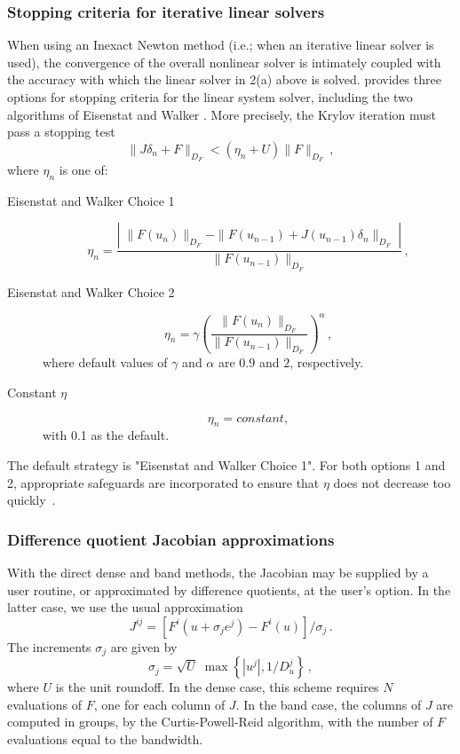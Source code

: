 \subsubsection*{Stopping criteria for iterative linear solvers}
When using an Inexact Newton method (i.e.; when an iterative linear solver is 
used), the convergence of the overall nonlinear solver is intimately coupled
with the accuracy with which the linear solver in 2(a) above is solved.
{\kinsol} provides three options for stopping criteria for the linear system 
solver, including the two algorithms of Eisenstat and Walker \cite{EiWa:96}. 
More precisely, the Krylov iteration must pass a stopping test
\[ \|J \delta_n + F\|_{D_F} < (\eta_n + U) \|F\|_{D_F} \, , \]
where $\eta_n$ is one of:
\begin{description}
\item[Eisenstat and Walker Choice 1]
  \[
  \eta_n = \frac{\left|\; \|F(u_n)\|_{D_F}
      - \|F(u_{n-1}) + J(u_{n-1}) \delta_n \|_{D_F}
      \; \right|}
  {\|F(u_{n-1})\|_{D_F}} \, ,
  \]
\item[Eisenstat and Walker Choice 2]
  \[
  \eta_n = \gamma
  \left( \frac{ \|F(u_n)\|_{D_F}}{\|F(u_{n-1})\|_{D_F}} \right)^{\alpha} \, ,
  \]
where default values of $\gamma$ and $\alpha$ are $0.9$ and $2$,
respectively.
\item[Constant $\eta$]
  \[
  \eta_n = constant,
  \]
with 0.1 as the default.
\end{description}
The default strategy is "Eisenstat and Walker Choice 1". 
For both options 1 and 2, appropriate safeguards are incorporated to ensure that
$\eta$ does not decrease too quickly~\cite{EiWa:96}.


\subsubsection*{Difference quotient Jacobian approximations}
With the direct dense and band methods, the Jacobian may be supplied
by a user routine, or approximated by difference quotients,
at the user's option.  In the latter case, we use the usual
approximation
\begin{equation}\label{e:JacDQ}
  J^{ij} = [F^i(u+\sigma_j e^j) - F^i(u)]/\sigma_j \, .
\end{equation}
The increments $\sigma_j$ are given by
\begin{equation}\label{e:sigmaDQ_direct}
  \sigma_j = \sqrt{U} \; \max\left\{ |u^j| , 1/D_u^j \right\} \, ,
\end{equation}
where $U$ is the unit roundoff.
In the dense case, this scheme requires $N$ evaluations of $F$, 
one for each column of $J$.  In the band case, the columns of 
$J$ are computed in groups, by the Curtis-Powell-Reid algorithm, 
with the number of $F$ evaluations equal to the bandwidth.


